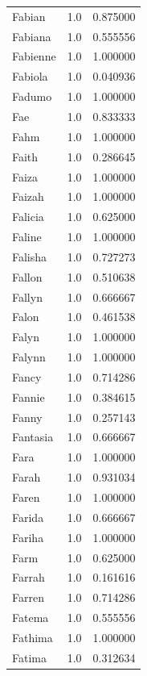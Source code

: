 \documentclass[
  letterpaper,
  DIV=11,
  numbers=noendperiod]{scrreprt}
\begin{document}
\begin{tabular}{lrr}
Fabian          &   1.0 &   0.875000 \\
Fabiana         &   1.0 &   0.555556 \\
Fabienne        &   1.0 &   1.000000 \\
Fabiola         &   1.0 &   0.040936 \\
Fadumo          &   1.0 &   1.000000 \\
Fae             &   1.0 &   0.833333 \\
Fahm            &   1.0 &   1.000000 \\
Faith           &   1.0 &   0.286645 \\
Faiza           &   1.0 &   1.000000 \\
Faizah          &   1.0 &   1.000000 \\
Falicia         &   1.0 &   0.625000 \\
Faline          &   1.0 &   1.000000 \\
Falisha         &   1.0 &   0.727273 \\
Fallon          &   1.0 &   0.510638 \\
Fallyn          &   1.0 &   0.666667 \\
Falon           &   1.0 &   0.461538 \\
Falyn           &   1.0 &   1.000000 \\
Falynn          &   1.0 &   1.000000 \\
Fancy           &   1.0 &   0.714286 \\
Fannie          &   1.0 &   0.384615 \\
Fanny           &   1.0 &   0.257143 \\
Fantasia        &   1.0 &   0.666667 \\
Fara            &   1.0 &   1.000000 \\
Farah           &   1.0 &   0.931034 \\
Faren           &   1.0 &   1.000000 \\
Farida          &   1.0 &   0.666667 \\
Fariha          &   1.0 &   1.000000 \\
Farm            &   1.0 &   0.625000 \\
Farrah          &   1.0 &   0.161616 \\
Farren          &   1.0 &   0.714286 \\
Fatema          &   1.0 &   0.555556 \\
Fathima         &   1.0 &   1.000000 \\
Fatima          &   1.0 &   0.312634 \\

\end{tabular}
\end{document}
